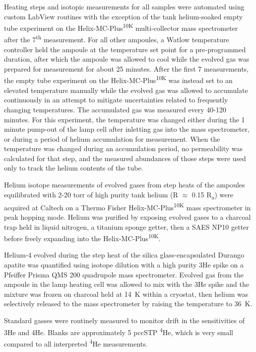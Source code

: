 Heating steps and isotopic measurements for all samples were automated using custom LabView routines with the exception of the tank helium-soaked empty tube experiment on the Helix-MC-Plus\textsuperscript{10K} multi-collector mass spectrometer after the 7\textsuperscript{th} measurement. For all other ampoules, a Watlow temperature controller held the ampoule at the temperature set point for a pre-programmed duration, after which the ampoule was allowed to cool while the evolved gas was prepared for measurement for about 25 minutes. After the first 7 measurements, the empty tube experiment on the Helix-MC-Plus\textsuperscript{10K} was instead set to an elevated temperature manually while the evolved gas was allowed to accumulate continuously in an attempt to mitigate uncertainties related to frequently changing temperatures. The accumulated gas was measured every 40-120 minutes. For this experiment, the temperature was changed either during the 1 minute pump-out of the lamp cell after inletting gas into the mass spectrometer, or during a period of helium accumulation for measurement. When the temperature was changed during an accumulation period, no permeability was calculated for that step, and the measured abundances of those steps were used only to track the helium contents of the tube.

Helium isotope measurements of evolved gases from step heats of the ampoules equilibrated with 2-20 torr of high purity tank helium (R $\approx$ 0.15 R\textsubscript{a}) were acquired at Caltech on a Thermo Fisher Helix-MC-Plus\textsuperscript{10K} mass spectrometer in peak hopping mode. Helium was purified by exposing evolved gases to a charcoal trap held in liquid nitrogen, a titanium sponge getter, then a SAES NP10 getter before freely expanding into the Helix-MC-Plus\textsuperscript{10K}. 

Helium-4 evolved during the step heat of the silica glass-encapsulated Durango apatite was quantified using isotope dilution with a high purity 3He spike on a Pfeiffer Prisma QMS 200 quadrupole mass spectrometer. Evolved gas from the ampoule in the lamp heating cell was allowed to mix with the 3He spike and the mixture was frozen on charcoal held at 14~K within a cryostat, then helium was selectively released to the mass spectrometer by raising the temperature to 36~K.

Standard gasses were routinely measured to monitor drift in the sensitivities of 3He and 4He. Blanks are approximately 5 pccSTP \textsuperscript{4}He, which is very small compared to all interpreted \textsuperscript{4}He measurements. 

